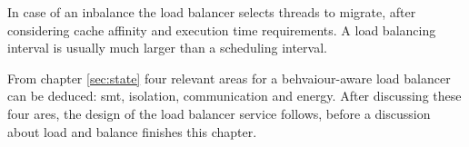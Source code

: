 In case of an inbalance the load balancer selects threads to migrate, after
considering cache affinity and execution time requirements.
A load balancing interval is usually much larger than a scheduling interval.

From chapter \ref{sec:state} four relevant areas for a behvaiour-aware load
balancer can be deduced:
\gls{smt}, isolation, communication and energy.
After discussing these four ares, the design of the load balancer service
follows,
before a discussion about load and balance finishes this chapter.



%






